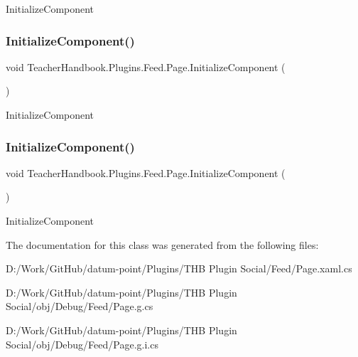 Initialize\+Component 

\mbox{\label{class_teacher_handbook_1_1_plugins_1_1_feed_1_1_page_a6ed1347e26e2ed603972b1d6627b8d56}} 
\subsubsection{\texorpdfstring{Initialize\+Component()}{InitializeComponent()}\hspace{0.1cm}{\footnotesize\ttfamily [3/4]}}
{\footnotesize\ttfamily void Teacher\+Handbook.\+Plugins.\+Feed.\+Page.\+Initialize\+Component (\begin{DoxyParamCaption}{ }\end{DoxyParamCaption})}



Initialize\+Component 

\mbox{\label{class_teacher_handbook_1_1_plugins_1_1_feed_1_1_page_a6ed1347e26e2ed603972b1d6627b8d56}} 
\subsubsection{\texorpdfstring{Initialize\+Component()}{InitializeComponent()}\hspace{0.1cm}{\footnotesize\ttfamily [4/4]}}
{\footnotesize\ttfamily void Teacher\+Handbook.\+Plugins.\+Feed.\+Page.\+Initialize\+Component (\begin{DoxyParamCaption}{ }\end{DoxyParamCaption})}



Initialize\+Component 



The documentation for this class was generated from the following files\+:\begin{DoxyCompactItemize}
\item 
D\+:/\+Work/\+Git\+Hub/datum-\/point/\+Plugins/\+T\+H\+B Plugin Social/\+Feed/Page.\+xaml.\+cs\item 
D\+:/\+Work/\+Git\+Hub/datum-\/point/\+Plugins/\+T\+H\+B Plugin Social/obj/\+Debug/\+Feed/Page.\+g.\+cs\item 
D\+:/\+Work/\+Git\+Hub/datum-\/point/\+Plugins/\+T\+H\+B Plugin Social/obj/\+Debug/\+Feed/Page.\+g.\+i.\+cs\end{DoxyCompactItemize}
